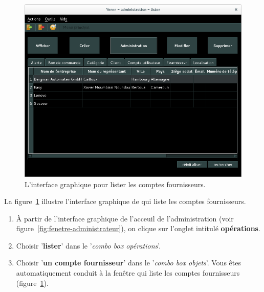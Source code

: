 \begin{figure}[!htpb]
	\centering
	\includegraphics[scale=0.45]{images/compte-fournisseur-lister.png}
	\caption{L'interface graphique pour lister les comptes fournisseurs.}
	\label{fig:admin-comptes-fournisseurs-lister}
\end{figure}

La figure~\ref{fig:admin-comptes-fournisseurs-lister} illustre
l'interface graphique de \yeren qui liste les comptes fournisseurs.

\begin{enumerate}[1)]
	\item \`A partir de l'interface graphique de l'acceuil de
		l'administration (voir figure~\ref{fig:fenetre-administrateur}),
		on clique sur l'onglet intitul\'e \textbf{op\'erations}. 
		
	\item Choisir '\textbf{lister}' dans le '\emph{combo box
		op\'erations}'.
		
	\item Choisir '\textbf{un compte fournisseur}' dans
		le '\emph{combo box objets}'. Vous \^etes automatiquement
		conduit \`a la fen\^etre qui liste les comptes fournisseurs
		(figure~\ref{fig:admin-comptes-fournisseurs-lister}).
\end{enumerate}


\newpage
{}

